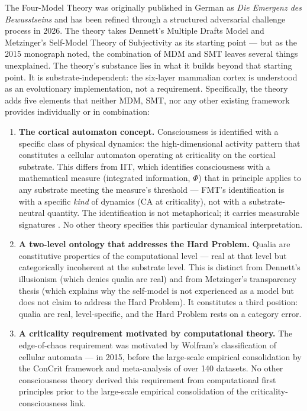 \documentclass[12pt]{article}
\newcommand{\rev}[1]{#1}
\begin{document}
The Four-Model Theory was originally published in German as \emph{Die Emergenz des Bewusstseins} \citep{Gruber2015} and has been refined through a structured adversarial challenge process in 2026. The theory takes Dennett's Multiple Drafts Model \citep{Dennett1991} and Metzinger's Self-Model Theory of Subjectivity \citep{Metzinger2003,Metzinger2009} as its starting point --- but as the 2015 monograph noted, the combination of MDM and SMT leaves several things unexplained. The theory's substance lies in what it builds beyond that starting point. It is substrate-independent: the six-layer mammalian cortex is understood as an evolutionary implementation, not a requirement. Specifically, the theory adds five elements that neither MDM, SMT, nor any other existing framework provides individually or in combination:

\begin{enumerate}
\item \textbf{The cortical automaton concept.} Consciousness is identified with a specific class of physical dynamics: the high-dimensional activity pattern that constitutes a cellular automaton operating at criticality on the cortical substrate. This differs from IIT, which identifies consciousness with a mathematical measure (integrated information, $\Phi$) that in principle applies to any substrate meeting the measure's threshold --- FMT's identification is with a specific \emph{kind} of dynamics (CA at criticality), not with a substrate-neutral quantity. The identification is not metaphorical; it carries measurable signatures \citep{Gruber2015}. No other theory specifies this particular dynamical interpretation.
\item \textbf{A two-level ontology that addresses the Hard Problem.} Qualia are constitutive properties of the computational level --- real at that level but categorically incoherent at the substrate level. This is distinct from Dennett's illusionism (which denies qualia are real) and from Metzinger's transparency thesis (which explains why the self-model is not experienced as a model but does not claim to address the Hard Problem). It constitutes a third position: qualia are real, level-specific, and the Hard Problem rests on a category error.
\item \textbf{A criticality requirement \rev{motivated} by computational theory.} The edge-of-chaos requirement was \rev{motivated} by Wolfram's classification of cellular automata \citep{Wolfram2002} --- in 2015, \rev{before the large-scale empirical consolidation} by the ConCrit framework \citep{AlgomShriki2026} and \citet{HengenShew2025} meta-analysis of over 140 datasets. No other consciousness theory derived this requirement from computational first principles prior to \rev{the large-scale empirical consolidation of the criticality-consciousness link}.

\end{enumerate}
\end{document}

